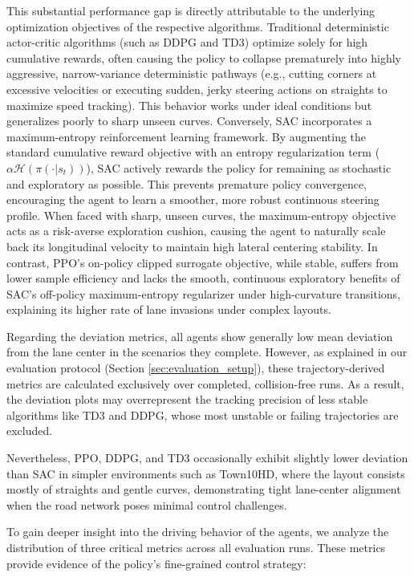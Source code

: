 \documentclass[sn-mathphys,Numbered]{sn-jnl}
\begin{document}
This substantial performance gap is directly attributable to the underlying optimization objectives of the respective algorithms. Traditional deterministic actor-critic algorithms (such as DDPG and TD3) optimize solely for high cumulative rewards, often causing the policy to collapse prematurely into highly aggressive, narrow-variance deterministic pathways (e.g., cutting corners at excessive velocities or executing sudden, jerky steering actions on straights to maximize speed tracking). This behavior works under ideal conditions but generalizes poorly to sharp unseen curves. Conversely, SAC incorporates a maximum-entropy reinforcement learning framework. By augmenting the standard cumulative reward objective with an entropy regularization term ($\alpha \mathcal{H}(\pi(\cdot|s_t))$), SAC actively rewards the policy for remaining as stochastic and exploratory as possible. This prevents premature policy convergence, encouraging the agent to learn a smoother, more robust continuous steering profile. When faced with sharp, unseen curves, the maximum-entropy objective acts as a risk-averse exploration cushion, causing the agent to naturally scale back its longitudinal velocity to maintain high lateral centering stability. In contrast, PPO's on-policy clipped surrogate objective, while stable, suffers from lower sample efficiency and lacks the smooth, continuous exploratory benefits of SAC's off-policy maximum-entropy regularizer under high-curvature transitions, explaining its higher rate of lane invasions under complex layouts.

Regarding the deviation metrics, all agents show generally low mean deviation from the lane center in the scenarios they complete. However, as explained in our evaluation protocol (Section \ref{sec:evaluation_setup}), these trajectory-derived metrics are calculated exclusively over completed, collision-free runs. As a result, the deviation plots may overrepresent the tracking precision of less stable algorithms like TD3 and DDPG, whose most unstable or failing trajectories are excluded.

Nevertheless, PPO, DDPG, and TD3 occasionally exhibit slightly lower deviation than SAC in simpler environments such as Town10HD, where the layout consists mostly of straights and gentle curves, demonstrating tight lane-center alignment when the road network poses minimal control challenges.

To gain deeper insight into the driving behavior of the agents, we analyze the distribution of three critical metrics across all evaluation runs. These metrics provide evidence of the policy's fine-grained control strategy:
\end{document}
